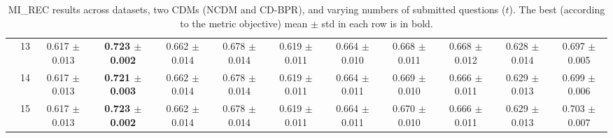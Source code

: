 \begin{table*}[t]
{\begin{tabular}{%
  ll
  @{\quad}
  c@{\hskip 4pt}c
  @{\quad\quad}
  c@{\hskip 4pt}c
  @{\quad\quad}
  c@{\hskip 4pt}c
  @{\quad\quad}
  c@{\hskip 4pt}c
  @{\quad\quad}
  c@{\hskip 4pt}c
}
        & 13 & 0.617 $\pm$ 0.013 & \textbf{0.723 $\pm$ 0.002} & 0.662 $\pm$ 0.014 & 0.678 $\pm$ 0.014 & 0.619 $\pm$ 0.011 & 0.664 $\pm$ 0.010 & 0.668 $\pm$ 0.011 & 0.668 $\pm$ 0.012 & 0.628 $\pm$ 0.014 & 0.697 $\pm$ 0.005 \\
        & 14 & 0.617 $\pm$ 0.013 & \textbf{0.721 $\pm$ 0.003} & 0.662 $\pm$ 0.014 & 0.678 $\pm$ 0.014 & 0.619 $\pm$ 0.011 & 0.664 $\pm$ 0.011 & 0.669 $\pm$ 0.010 & 0.666 $\pm$ 0.011 & 0.629 $\pm$ 0.013 & 0.699 $\pm$ 0.006 \\
        & 15 & 0.617 $\pm$ 0.013 & \textbf{0.723 $\pm$ 0.002} & 0.662 $\pm$ 0.014 & 0.678 $\pm$ 0.014 & 0.619 $\pm$ 0.011 & 0.664 $\pm$ 0.011 & 0.670 $\pm$ 0.010 & 0.666 $\pm$ 0.011 & 0.629 $\pm$ 0.013 & 0.703 $\pm$ 0.007 \\
\bottomrule
\end{tabular}
}
\caption{MI_REC results across datasets, two CDMs (NCDM and CD-BPR), and varying numbers of submitted questions ($t$). The best (according to the metric objective) mean $\pm$ std in each row is in bold.}
\label{tab:results-mi_rec}
\end{table*}


